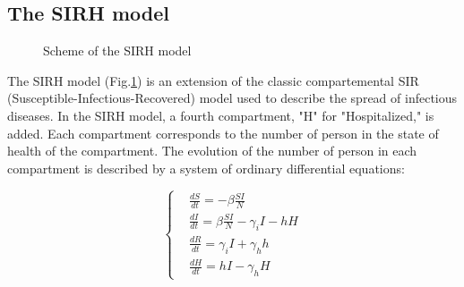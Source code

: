 \subsection{The SIRH model}



\begin{figure}[h]
    \centering
    \caption{Scheme of the SIRH model}
    \label{fig:sirh}

    
\end{figure}

The SIRH model (Fig.\ref{fig:sirh}) is an extension of the classic compartemental SIR (Susceptible-Infectious-Recovered) model used to describe the spread of infectious diseases.
In the SIRH model, a fourth compartment, "H" for "Hospitalized," is added. 
Each compartment corresponds to the number of person in the state of health of the compartment. 
The evolution of the number of person in each compartment is described by a system of ordinary differential equations: 

\begin{equation}
    \label{eq:sirh}
    \left\{
    \begin{aligned}
        &\frac{dS}{dt} = - \beta \frac{SI}{N} \\
        &\frac{dI}{dt} = \beta \frac{SI}{N} - \gamma_i I - h H \\
        &\frac{dR}{dt} = \gamma_i I + \gamma_h h \\
        &\frac{dH}{dt} = h I - \gamma_h H
    \end{aligned}
    \right.
\end{equation}

